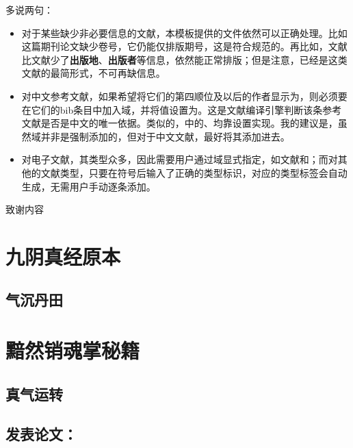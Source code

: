 \documentclass[print, promaster, vlined]{DissertUESTC}
\begin{document}
	多说两句：
	\begin{itemize}
		\item 对于某些缺少非必要信息的文献，本模板提供的文件依然可以正确处理。比如\cite{王晓琰2019关于连续出版会议论文著录格式的探讨}这篇期刊论文缺少卷号，它仍能仅排版期号，这是符合规范的。再比如，文献\cite{电子文献2}比文献\cite{电子文献1}少了\textbf{出版地}、\textbf{出版者}等信息，依然能正常排版；但是注意，\cite{电子文献2}已经是这类文献的最简形式，不可再缺信息。
		
		\item 对中文参考文献，如果希望将它们的第四顺位及以后的作者显示为，则必须要在它们的bib条目中加入域，并将值设置为。这是文献编译引擎判断该条参考文献是否是中文的唯一依据。类似的，\cite{罗杰斯2011}中的、均靠设置实现。我的建议是，虽然域并非是强制添加的，但对于中文文献，最好将其添加进去。
		
		\item 对电子文献，其类型众多，因此需要用户通过域显式指定，如文献\cite{电子文献1}和\cite{电子文献2}；而对其他的文献类型，只要在符号后输入了正确的类型标识，对应的类型标签会自动生成，无需用户手动逐条添加。
	\end{itemize}
	
	
	\acknowledgement
	
	致谢内容
	
	
	
	
	
	\appendix
	
	\chapter{九阴真经原本}
	\section{气沉丹田}
	
	\chapter{黯然销魂掌秘籍}
	\section{真气运转}
	
	\achievement %
	
	\section*{发表论文：}
	
\end{document}
